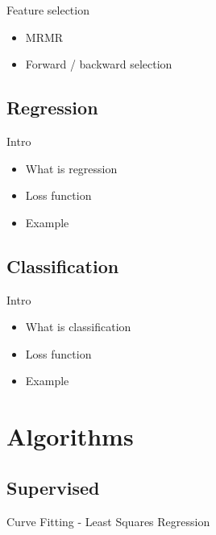     \begin{frame}{Feature selection}
      \begin{itemize}
        \item MRMR
        \item Forward / backward selection
      \end{itemize}
    \end{frame}

  \subsection{Regression}

  \begin{frame}{Intro}
    \begin{itemize}
      \item What is regression
      \item Loss function
      \item Example
    \end{itemize}
  \end{frame}

  \subsection{Classification}

  \begin{frame}{Intro}
    \begin{itemize}
      \item What is classification
      \item Loss function
      \item Example
    \end{itemize}
  \end{frame}

\section{Algorithms}
  \subsection{Supervised}

  \begin{frame}{Curve Fitting - Least Squares}
  Regression
  \end{frame}

